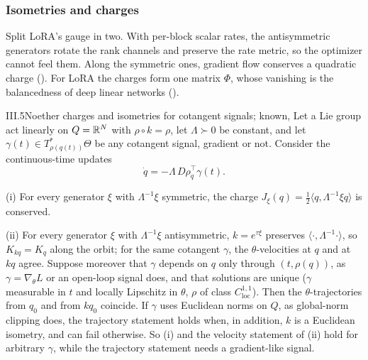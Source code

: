 \subsubsection{Isometries and charges}\label{sec:fibres-charges}

Split LoRA's gauge in two. With per-block scalar rates, the antisymmetric generators rotate the rank channels and preserve the rate metric, so the optimizer cannot feel them. Along the symmetric ones, gradient flow conserves a quadratic charge (). For LoRA the charges form one matrix $\Phi$, whose vanishing is the balancedness of deep linear networks ().

\begin{theorem}{III.5}{Noether charges and isometries for cotangent signals; known, \citet{zhao2022symmetries}}
Let a Lie group act linearly on $Q=\mathbb{R}^N$ with $\rho\circ k=\rho$, let $\Lambda\succ0$ be constant, and let $\gamma(t)\in T^*_{\rho(q(t))}\Theta$ be any cotangent signal, gradient or not. Consider the continuous-time updates
\[\dot q=-\Lambda\,D\rho_q^\top\gamma(t).\]

(i) For every generator $\xi$ with $\Lambda^{-1}\xi$ symmetric, the charge $J_\xi(q)=\tfrac12\langle q,\Lambda^{-1}\xi q\rangle$ is conserved.

(ii) For every generator $\xi$ with $\Lambda^{-1}\xi$ antisymmetric, $k=e^{\tau\xi}$ preserves $\langle\cdot,\Lambda^{-1}\cdot\rangle$, so $K_{kq}=K_q$ along the orbit; for the same cotangent $\gamma$, the $\theta$-velocities at $q$ and at $kq$ agree. Suppose moreover that $\gamma$ depends on $q$ only through $(t,\rho(q))$, as $\gamma=\nabla_\theta L$ or an open-loop signal does, and that solutions are unique ($\gamma$ measurable in $t$ and locally Lipschitz in $\theta$, $\rho$ of class $C^{1,1}_{\mathrm{loc}}$). Then the $\theta$-trajectories from $q_0$ and from $kq_0$ coincide. If $\gamma$ uses Euclidean norms on $Q$, as global-norm clipping does, the trajectory statement holds when, in addition, $k$ is a Euclidean isometry, and can fail otherwise. So (i) and the velocity statement of (ii) hold for arbitrary $\gamma$, while the trajectory statement needs a gradient-like signal.


\end{theorem}

